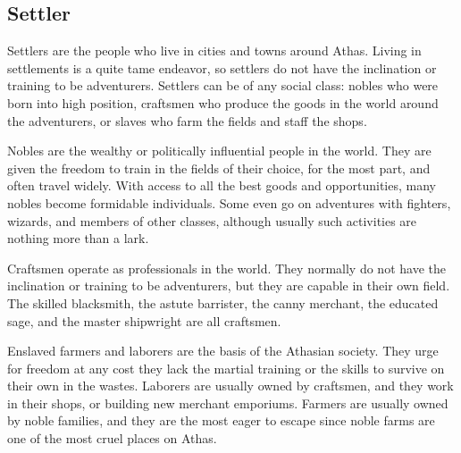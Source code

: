 \subsection{Settler}
Settlers are the people who live in cities and towns around Athas. Living in settlements is a quite tame endeavor, so settlers do not have the inclination or training to be adventurers. Settlers can be of any social class: nobles who were born into high position, craftsmen who produce the goods in the world around the adventurers, or slaves who farm the fields and staff the shops.

\begin{itemize*}
\item Nobles are the wealthy or politically influential people in the world. They are given the freedom to train in the fields of their choice, for the most part, and often travel widely. With access to all the best goods and opportunities, many nobles become formidable individuals. Some even go on adventures with fighters, wizards, and members of other classes, although usually such activities are nothing more than a lark.
\item Craftsmen operate as professionals in the world. They normally do not have the inclination or training to be adventurers, but they are capable in their own field. The skilled blacksmith, the astute barrister, the canny merchant, the educated sage, and the master shipwright are all craftsmen.
\item Enslaved farmers and laborers are the basis of the Athasian society. They urge for freedom at any cost they lack the martial training or the skills to survive on their own in the wastes. Laborers are usually owned by craftsmen, and they work in their shops, or building new merchant emporiums. Farmers are usually owned by noble families, and they are the most eager to escape since noble farms are one of the most cruel places on Athas.
\end{itemize*}


